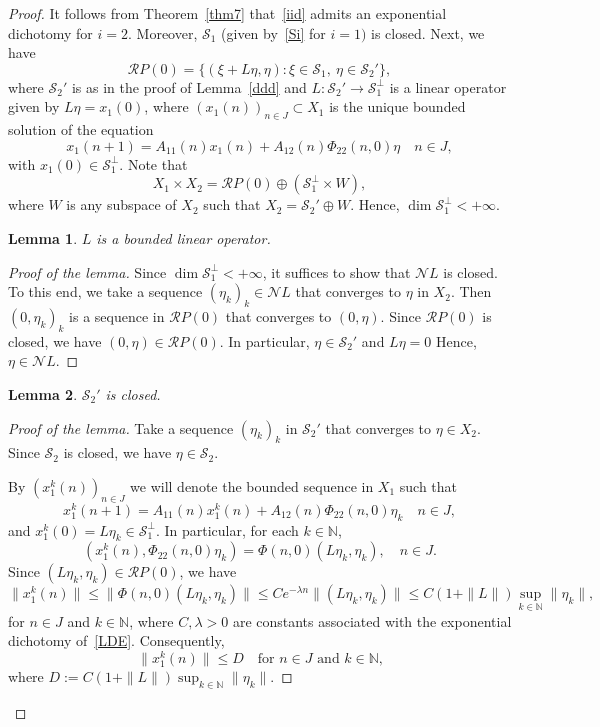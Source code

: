 \documentclass[11pt,reqno,a4paper]{amsart}
\theoremstyle{plain}
\numberwithin{equation}{section}
\newtheorem{lemma}{Lemma}
\theoremstyle{remark}
\begin{document}
\begin{proof}
It follows from Theorem~\ref{thm7} that~\eqref{iid} admits an exponential dichotomy for $i=2$. Moreover, $\mathcal S_1$ (given by~\eqref{Si} for $i=1)$ is closed. 
Next, we have
\[
\mathcal R P(0)=\{(\xi+L\eta, \eta): \xi \in \mathcal S_1, \ \eta \in \mathcal S_2'\},
\]
where $\mathcal S_2'$ is as in the proof of Lemma~\ref{ddd} and $L\colon \mathcal S_2'\to \mathcal S_1^\perp$ is a linear operator given by $L\eta=x_1(0)$, where $(x_1(n))_{n\in J}\subset X_1$ is the unique bounded solution of the equation
\[
x_1(n+1)=A_{11}(n)x_1(n)+A_{12}(n)\Phi_{22}(n, 0)\eta \quad n\in J,
\]
with $x_1(0)\in \mathcal S_1^\perp$. Note that 
\[
X_1\times X_2=\mathcal RP(0)\oplus (\mathcal S_1^\perp \times W),
\]
where $W$ is any subspace of $X_2$ such that $X_2=\mathcal S_2'\oplus W$. Hence, $\dim \mathcal S_1^\perp<+\infty$.
\begin{lemma}\label{bounded}
$L$ is a bounded linear operator.
\end{lemma}

\begin{proof}[Proof of the lemma]
Since $\dim \mathcal S_1^\perp<+\infty$, it suffices to show that $\mathcal N L$ is closed. To this end, we take a sequence $(\eta_k)_k \in \mathcal N L$ that converges to $\eta$ in $X_2$. Then $(0, \eta_k)_k$ is a sequence in $\mathcal RP(0)$ that converges to $(0, \eta)$. Since $\mathcal RP(0)$ is closed, we have $(0, \eta)\in \mathcal R P(0)$. In particular, $\eta \in \mathcal S_2'$ and $L\eta=0$
Hence, $\eta \in \mathcal N L$.
\end{proof}
\begin{lemma}\label{closed}
$\mathcal S_2'$ is closed.
\end{lemma}

\begin{proof}[Proof of the lemma]
Take a sequence $(\eta_k)_k$ in $\mathcal S_2'$ that converges to $\eta\in X_2$. Since $\mathcal S_2$ is closed, we have $\eta \in \mathcal S_2$.

By $(x_1^k(n))_{n\in J}$ we will denote the bounded sequence in $X_1$ such that 
\begin{equation}\label{x11k}
    x_1^k(n+1)=A_{11}(n)x_1^k(n)+A_{12}(n)\Phi_{22}(n, 0)\eta_k \quad n\in J,
\end{equation}
and $x_1^k(0)=L\eta_k \in \mathcal S_1^\perp$. In particular, for each $k\in \mathbb N$,
\[
(x_1^k(n), \Phi_{22}(n, 0)\eta_k)=\Phi(n, 0)(L\eta_k, \eta_k), \quad n\in J.
\]
Since $(L\eta_k, \eta_k)\in \mathcal R P(0)$, we have
\[
\|x_1^k(n)\| \le \|\Phi(n, 0)(L\eta_k, \eta_k)\| \le Ce^{-\lambda n} \|(L\eta_k, \eta_k)\| \le C(1+\|L\|)\sup_{k\in \mathbb N}\|\eta_k\|,
\]
for $n\in J$ and $k\in \mathbb N$, where $C, \lambda>0$ are constants associated with the exponential dichotomy of~\eqref{LDE}. Consequently, 
\[
\|x_1^k(n)\| \le D \quad \text{for $n\in J$ and $k\in \mathbb N$,}
\]
where $D:=C(1+\|L\|)\sup_{k\in \mathbb N}\|\eta_k\|$.


\end{proof}
\end{proof}
\end{document}
